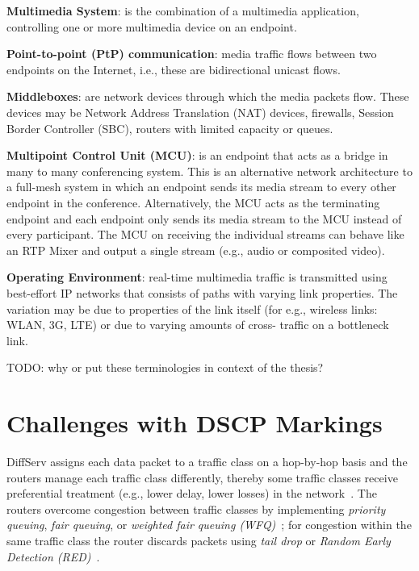 \textbf{Multimedia System}: is the combination of a multimedia application,
controlling one or more multimedia device on an endpoint.

\textbf{Point-to-point (PtP) communication}: media traffic flows between two
endpoints on the Internet, i.e., these are bidirectional unicast flows.

\textbf{Middleboxes}: are network devices through which the media packets
flow. These devices may be Network Address Translation (NAT) devices,
firewalls, Session Border Controller (SBC), routers with limited capacity or
queues.

\textbf{Multipoint Control Unit (MCU)}: is an endpoint that acts as a bridge
in many to many conferencing system. This is an alternative network
architecture to a full-mesh system in which an endpoint sends its media stream
to every other endpoint in the conference. Alternatively, the MCU acts as the
terminating endpoint and each endpoint only sends its media stream  to the MCU
instead of every participant. The MCU on receiving the individual streams can
behave like an RTP Mixer and output a single stream (e.g., audio or composited
video).

\textbf{Operating Environment}: real-time multimedia traffic is
transmitted using best-effort IP networks that consists of paths with varying
link properties. The variation may be due to properties of the link itself
(for e.g., wireless links: WLAN, 3G, LTE) or due to varying amounts of cross-
traffic on a bottleneck link.

 {\color{red} TODO: why or put these terminologies in context of the thesis?}


\section{Challenges with DSCP Markings}
\label{rg.ch.dscp}

DiffServ assigns each data packet to a traffic class on a hop-by-hop basis and
the routers manage each traffic class differently, thereby some traffic
classes receive preferential treatment (e.g., lower delay, lower losses) in
the network~\cite{rfc2475}. The routers overcome congestion between traffic
classes by implementing \emph{priority queuing}, \emph{fair queuing}, or
\emph{weighted fair queuing (WFQ)}~\cite{rfc4594}; for congestion within the
same traffic class the router discards packets using \emph{tail drop} or
\emph{Random Early Detection (RED)}~\cite{Floyd:RED}.

